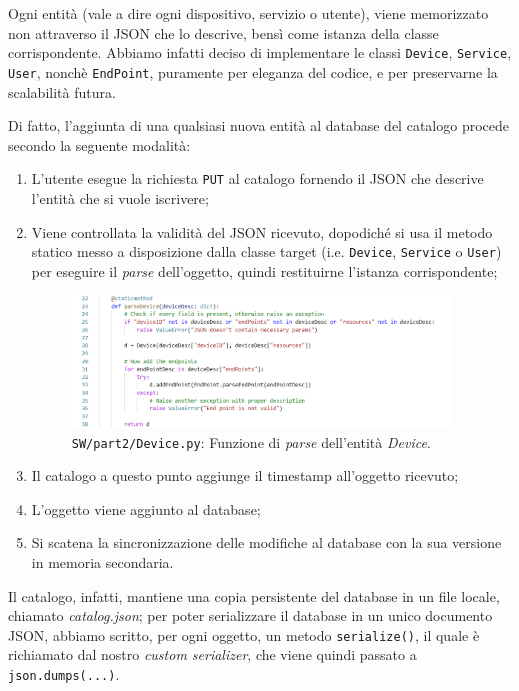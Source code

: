 \documentclass[12pt,a4paper]{article}
\begin{document}
Ogni entità (vale a dire ogni dispositivo, servizio o utente), viene memorizzato non attraverso il JSON che lo descrive, bensì come istanza della classe corrispondente. Abbiamo infatti deciso di implementare le classi \verb|Device|, \verb|Service|, \verb|User|, nonchè \verb|EndPoint|, puramente per eleganza del codice, e per preservarne la scalabilità futura.

Di fatto, l'aggiunta di una qualsiasi nuova entità al database del catalogo procede secondo la seguente modalità:
\begin{enumerate}
    \item L'utente esegue la richiesta \verb|PUT| al catalogo fornendo il JSON che descrive l'entità che si vuole iscrivere;
    \item Viene controllata la validità del JSON ricevuto, dopodiché si usa il metodo statico messo a disposizione dalla classe target (i.e. \verb|Device|, \verb|Service| o \verb|User|) per eseguire il \textit{parse} dell'oggetto, quindi restituirne l'istanza corrispondente;
    \begin{figure}[htbp]
    \centering
    \includegraphics[width=0.95\textwidth]{parse_device.png}
    \caption*{\texttt{SW/part2/Device.py}: Funzione di \textit{parse} dell'entità \textit{Device}.}
    \label{fig:parse_device}
\end{figure}
    \item Il catalogo a questo punto aggiunge il timestamp all'oggetto ricevuto;
    \item L'oggetto viene aggiunto al database;
    \item Si scatena la sincronizzazione delle modifiche al database con la sua versione in memoria secondaria.
\end{enumerate}

Il catalogo, infatti, mantiene una copia persistente del database in un file locale, chiamato \textit{catalog.json}; per poter serializzare il database in un unico documento JSON, abbiamo scritto, per ogni oggetto, un metodo \verb|serialize()|, il quale è richiamato dal nostro \textit{custom serializer}, che viene quindi passato a \verb|json.dumps(...)|.
\end{document}

